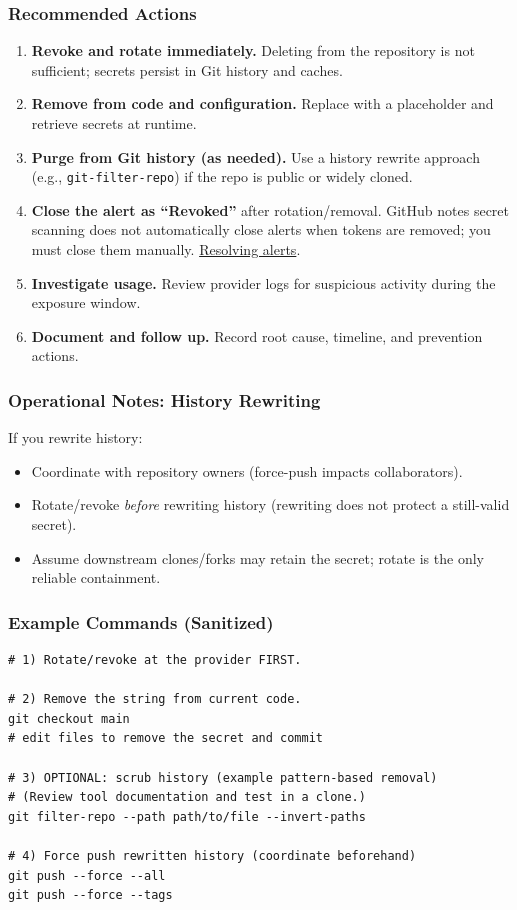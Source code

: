 \documentclass[11pt]{article}
\newcommand{\codeinline}[1]{\texttt{#1}}
\begin{document}
\subsubsection{Recommended Actions}
\begin{enumerate}
  \item \textbf{Revoke and rotate immediately.} Deleting from the repository is not sufficient; secrets persist in Git history and caches.
  \item \textbf{Remove from code and configuration.} Replace with a placeholder and retrieve secrets at runtime.
  \item \textbf{Purge from Git history (as needed).} Use a history rewrite approach (e.g., \codeinline{git-filter-repo}) if the repo is public or widely cloned.
  \item \textbf{Close the alert as ``Revoked''} after rotation/removal. GitHub notes secret scanning does not automatically close alerts when tokens are removed; you must close them manually. \href{https://docs.github.com/code-security/secret-scanning/managing-alerts-from-secret-scanning/resolving-alerts}{Resolving alerts}.
  \item \textbf{Investigate usage.} Review provider logs for suspicious activity during the exposure window.
  \item \textbf{Document and follow up.} Record root cause, timeline, and prevention actions.
\end{enumerate}

\subsubsection{Operational Notes: History Rewriting}
If you rewrite history:
\begin{itemize}
  \item Coordinate with repository owners (force-push impacts collaborators).
  \item Rotate/revoke \emph{before} rewriting history (rewriting does not protect a still-valid secret).
  \item Assume downstream clones/forks may retain the secret; rotate is the only reliable containment.
\end{itemize}

\subsubsection{Example Commands (Sanitized)}
\begin{verbatim}
# 1) Rotate/revoke at the provider FIRST.

# 2) Remove the string from current code.
git checkout main
# edit files to remove the secret and commit

# 3) OPTIONAL: scrub history (example pattern-based removal)
# (Review tool documentation and test in a clone.)
git filter-repo --path path/to/file --invert-paths

# 4) Force push rewritten history (coordinate beforehand)
git push --force --all
git push --force --tags
\end{verbatim}
\end{document}
